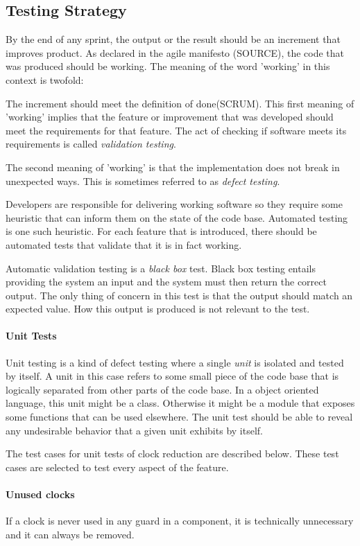 \subsection{Testing Strategy}
By the end of any sprint, the output or the result should be an increment that improves product. As declared in the agile manifesto (SOURCE), the code that was produced should be working. The meaning of the word 'working' in this context is twofold: 

The increment should meet the definition of done(SCRUM). This first meaning of 'working' implies that the feature or improvement that was developed should meet the requirements for that feature. The act of checking if software meets its requirements is called \emph{validation testing}.

The second meaning of 'working' is that the implementation does not break in unexpected ways. This is sometimes referred to as \emph{defect testing}.

Developers are responsible for delivering working software so they require some heuristic that can inform them on the state of the code base. Automated testing is one such heuristic. For each feature that is introduced, there should be automated tests that validate that it is in fact working.

Automatic validation testing is a \emph{black box} test. Black box testing entails providing the system an input and the system must then return the correct output. The only thing of concern in this test is that the output should match an expected value. How this output is produced is not relevant to the test.


\paragraph{Unit Tests}
Unit testing is a kind of defect testing where a single \emph{unit} is isolated and tested by itself. A unit in this case refers to some small piece of the code base that is logically separated from other parts of the code base. In a object oriented language, this unit might be a class. Otherwise it might be a module that exposes some functions that can be used elsewhere. The unit test should be able to reveal any undesirable behavior that a given unit exhibits by itself. 

The test cases for unit tests of clock reduction are described below. These test cases are selected to test every aspect of the feature.

\paragraph{Unused clocks}
If a clock is never used in any guard in a component, it is technically unnecessary and it can always be removed.


